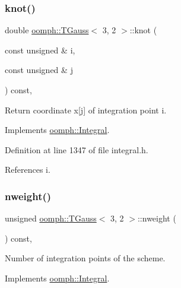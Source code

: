 \subsubsection{\texorpdfstring{knot()}{knot()}}
{\footnotesize\ttfamily double \hyperlink{classoomph_1_1TGauss}{oomph\+::\+T\+Gauss}$<$ 3, 2 $>$\+::knot (\begin{DoxyParamCaption}\item[{const unsigned \&}]{i,  }\item[{const unsigned \&}]{j }\end{DoxyParamCaption}) const\hspace{0.3cm}{\ttfamily [inline]}, {\ttfamily [virtual]}}



Return coordinate x\mbox{[}j\mbox{]} of integration point i. 



Implements \hyperlink{classoomph_1_1Integral_a1a2122f99a87c18649bafdd9ed739758}{oomph\+::\+Integral}.



Definition at line 1347 of file integral.\+h.



References i.

\mbox{\label{classoomph_1_1TGauss_3_013_00_012_01_4_ad1775de0ac3ca89358dbcb3b42e177d0}} 
\subsubsection{\texorpdfstring{nweight()}{nweight()}}
{\footnotesize\ttfamily unsigned \hyperlink{classoomph_1_1TGauss}{oomph\+::\+T\+Gauss}$<$ 3, 2 $>$\+::nweight (\begin{DoxyParamCaption}{ }\end{DoxyParamCaption}) const\hspace{0.3cm}{\ttfamily [inline]}, {\ttfamily [virtual]}}



Number of integration points of the scheme. 



Implements \hyperlink{classoomph_1_1Integral_a1a270de9d99a1fcf1d25a6c1017f65fa}{oomph\+::\+Integral}.




